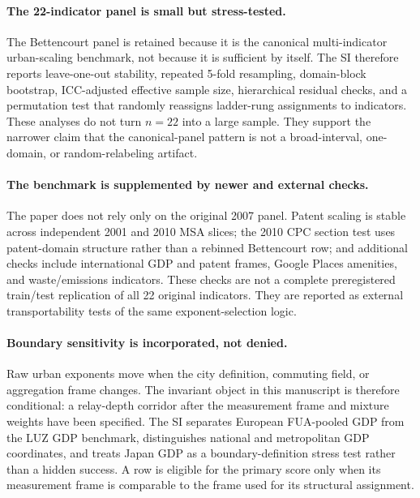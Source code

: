 \paragraph{The 22-indicator panel is small but stress-tested.}
The Bettencourt panel is retained because it is the canonical multi-indicator
urban-scaling benchmark, not because it is sufficient by itself.  The SI
therefore reports leave-one-out stability, repeated 5-fold resampling,
domain-block bootstrap, ICC-adjusted effective sample size, hierarchical
residual checks, and a permutation test that randomly reassigns ladder-rung
assignments to indicators.  These analyses do not turn \(n=22\) into a
large sample.  They support the narrower claim that the canonical-panel
pattern is not a broad-interval, one-domain, or random-relabeling artifact.

\paragraph{The benchmark is supplemented by newer and external checks.}
The paper does not rely only on the original 2007 panel.  Patent scaling is
stable across independent 2001 and 2010 MSA slices; the 2010 CPC section test
uses patent-domain structure rather than a rebinned Bettencourt row; and
additional checks include international GDP and patent frames, Google Places
amenities, and waste/emissions indicators.  These checks are not a complete
preregistered train/test replication of all 22 original indicators.  They are
reported as external transportability tests of the same exponent-selection
logic.

\paragraph{Boundary sensitivity is incorporated, not denied.}
Raw urban exponents move when the city definition, commuting field, or
aggregation frame changes.  The invariant object in this manuscript is
therefore conditional: a relay-depth corridor after the measurement frame and
mixture weights have been specified.  The SI separates European FUA-pooled
GDP from the LUZ GDP benchmark, distinguishes national and metropolitan GDP
coordinates, and treats Japan GDP as a boundary-definition stress test rather
than a hidden success.  A row is eligible for the primary score only when its
measurement frame is comparable to the frame used for its structural
assignment.

